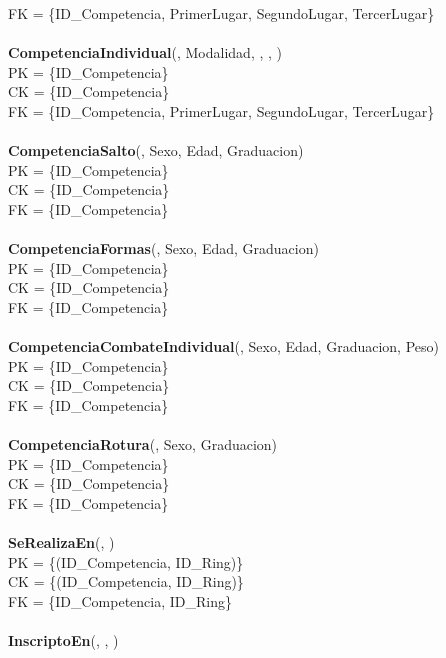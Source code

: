 FK = \{ID\_Competencia, PrimerLugar, SegundoLugar, TercerLugar\}\\
\\
\textbf{CompetenciaIndividual}(, Modalidad, , , )\\
PK = \{ID\_Competencia\}\\
CK = \{ID\_Competencia\}\\
FK = \{ID\_Competencia, PrimerLugar, SegundoLugar, TercerLugar\}\\
\\
\textbf{CompetenciaSalto}(, Sexo, Edad, Graduacion)\\
PK = \{ID\_Competencia\}\\
CK = \{ID\_Competencia\}\\
FK = \{ID\_Competencia\}\\
\\
\textbf{CompetenciaFormas}(, Sexo, Edad, Graduacion)\\
PK = \{ID\_Competencia\}\\
CK = \{ID\_Competencia\}\\
FK = \{ID\_Competencia\}\\
\\
\textbf{CompetenciaCombateIndividual}(, Sexo, Edad, Graduacion, Peso)\\
PK = \{ID\_Competencia\}\\
CK = \{ID\_Competencia\}\\
FK = \{ID\_Competencia\}\\
\\
\textbf{CompetenciaRotura}(, Sexo, Graduacion)\\
PK = \{ID\_Competencia\}\\
CK = \{ID\_Competencia\}\\
FK = \{ID\_Competencia\}\\
\\
\textbf{SeRealizaEn}(, )\\
PK = \{(ID\_Competencia, ID\_Ring)\}\\
CK = \{(ID\_Competencia, ID\_Ring)\}\\
FK = \{ID\_Competencia, ID\_Ring\}\\
\\
\textbf{InscriptoEn}(, , )\\
